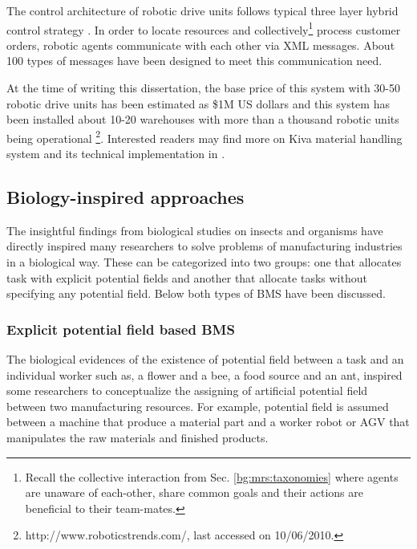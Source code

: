 The control architecture of robotic drive units follows typical three layer hybrid control strategy \cite{Simmons+2002}. In order to locate resources and collectively\footnote{Recall the collective interaction  from Sec. \ref{bg:mrs:taxonomies} where agents are unaware of each-other, share common goals and their actions are beneficial to their team-mates.} process customer orders, robotic agents communicate with each other via XML messages. About 100 types of messages have been designed to meet this communication need.

At the  time of writing this dissertation,  the base price of this system with 30-50 robotic drive units has been estimated as \$1M US dollars and this system has been installed about 10-20 warehouses with more than a thousand robotic units being operational \footnote{http://www.roboticstrends.com/, last accessed on 10/06/2010.}.  Interested readers may find more on Kiva material handling system and its technical implementation in .
\subsection{Biology-inspired approaches}
The insightful findings from biological studies on insects and organisms have directly inspired many researchers to solve problems of manufacturing industries in a biological way. These can be categorized into two groups: one that allocates task with explicit  potential fields and another that allocate tasks without specifying any potential field. Below  both types of \acf{BMS}  have been discussed.
\subsubsection*{Explicit potential field based BMS}
The biological evidences of the existence of potential field between a task and an individual worker such as, a flower and a bee, a food source and an ant, inspired some researchers to conceptualize the assigning of artificial potential field between two manufacturing resources. For example, potential field is assumed between a machine that produce a material part and a worker robot or AGV that manipulates the raw materials and finished products.

